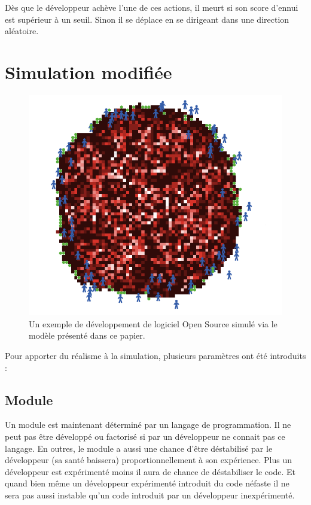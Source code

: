 \documentclass{article}
\begin{document}
Dès que le développeur achève l'une de ces actions, il meurt si son score d'ennui est supérieur à un seuil. Sinon il se déplace en se dirigeant dans une direction aléatoire.

\section{Simulation modifiée}

\begin{figure}[H]
  \centerline{\includegraphics[scale=0.45]{pictures/Image1.png}}
  \caption{Un exemple de développement de logiciel Open Source
    simulé via le modèle présenté dans ce papier.}
\end{figure}

Pour apporter du réalisme à la simulation, plusieurs paramètres ont été introduits :

\subsection{Module}
Un module est maintenant déterminé par un langage de programmation. Il ne peut pas être développé ou factorisé si par un développeur ne connait pas ce langage. En outres, le module a aussi une chance d'être déstabilisé par le développeur (sa santé baissera) proportionnellement à son expérience. Plus un développeur est expérimenté moins il aura de chance de déstabiliser le code. Et quand bien même un développeur expérimenté introduit du code néfaste il ne sera pas aussi instable qu'un code introduit par un développeur inexpérimenté.
\end{document}
